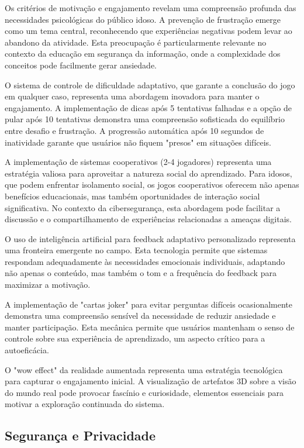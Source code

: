 \begin{table}[H]
Os critérios de motivação e engajamento revelam uma compreensão profunda das necessidades psicológicas do público idoso. A prevenção de frustração emerge como um tema central, reconhecendo que experiências negativas podem levar ao abandono da atividade. Esta preocupação é particularmente relevante no contexto da educação em segurança da informação, onde a complexidade dos conceitos pode facilmente gerar ansiedade.

O sistema de controle de dificuldade adaptativo, que garante a conclusão do jogo em qualquer caso, representa uma abordagem inovadora para manter o engajamento. A implementação de dicas após 5 tentativas falhadas e a opção de pular após 10 tentativas demonstra uma compreensão sofisticada do equilíbrio entre desafio e frustração. A progressão automática após 10 segundos de inatividade garante que usuários não fiquem "presos" em situações difíceis.

A implementação de sistemas cooperativos (2-4 jogadores) representa uma estratégia valiosa para aproveitar a natureza social do aprendizado. Para idosos, que podem enfrentar isolamento social, os jogos cooperativos oferecem não apenas benefícios educacionais, mas também oportunidades de interação social significativa. No contexto da cibersegurança, esta abordagem pode facilitar a discussão e o compartilhamento de experiências relacionadas a ameaças digitais.

O uso de inteligência artificial para feedback adaptativo personalizado representa uma fronteira emergente no campo. Esta tecnologia permite que sistemas respondam adequadamente às necessidades emocionais individuais, adaptando não apenas o conteúdo, mas também o tom e a frequência do feedback para maximizar a motivação.

A implementação de "cartas joker" para evitar perguntas difíceis ocasionalmente demonstra uma compreensão sensível da necessidade de reduzir ansiedade e manter participação. Esta mecânica permite que usuários mantenham o senso de controle sobre sua experiência de aprendizado, um aspecto crítico para a autoeficácia.

O "wow effect" da realidade aumentada representa uma estratégia tecnológica para capturar o engajamento inicial. A visualização de artefatos 3D sobre a visão do mundo real pode provocar fascínio e curiosidade, elementos essenciais para motivar a exploração continuada do sistema.

\subsection{Segurança e Privacidade}
\label{subsec:seguranca_expandida}


\end{table}
